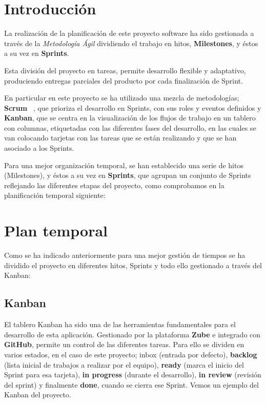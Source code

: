 
\section{Introducción}

La realización de la planificación de este proyecto software ha sido gestionada a través de la \textit{\gls{Metodología Ágil}} dividiendo el trabajo en hitos, \textbf{\gls{Milestone}s}, y éstos a su vez en \textbf{\gls{Sprint}s}.

Esta división del proyecto en tareas, permite desarrollo flexible y adaptativo, produciendo entregas parciales del producto por cada finalización de \gls{Sprint}.

En particular en este proyecto se ha utilizado una mezcla de metodologías; \textbf{\gls{Scrum}} ~\cite{SchwaberGuiaDefinitivaScrum2020}, que prioriza el desarrollo en \gls{Sprint}s, con sus roles y eventos definidos y \textbf{\gls{Kanban}}, que se centra en la visualización de los flujos de trabajo en un tablero con columnas, etiquetadas con las diferentes fases del desarrollo, en las cuales se van colocando tarjetas con las tareas que se están realizando y que se han asociado a los \gls{Sprint}s.

Para una mejor organización temporal, se han establecido una serie de hitos (\gls{Milestone}s), y éstos a su vez en \textbf{\gls{Sprint}s}, que agrupan un conjunto de \gls{Sprint}s reflejando las diferentes etapas del proyecto, como comprobamos en la planificación temporal siguiente:

\section{Plan temporal}
Como se ha indicado anteriormente para una mejor gestión de tiempos se ha dividido el proyecto en diferentes hitos, \gls{Sprint}s y todo ello gestionado a través del \gls{Kanban}:
\subsection{Kanban}
El tablero \gls{Kanban} ha sido una de las herramientas fundamentales para el desarrollo de esta aplicación. Gestionado por la plataforma \textbf{Zube} e integrado con \textbf{GitHub}, permite un control de las diferentes tareas. Para ello se dividen en varios estados, en el caso de este proyecto; inbox (entrada por defecto), \textbf{backlog} (lista inicial de trabajos a realizar por el equipo), \textbf{ready} (marca el inicio del \gls{Sprint} para esa tarjeta), \textbf{in progress} (durante el desarrollo), \textbf{in review} (revisión del sprint) y finalmente \textbf{done}, cuando se cierra ese \gls{Sprint}.
Vemos un ejemplo del \gls{Kanban} del proyecto.
